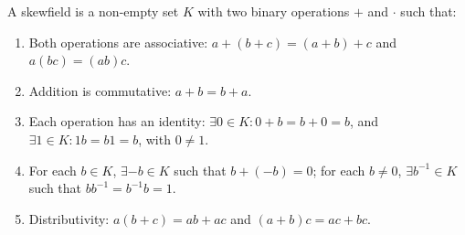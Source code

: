 A skewfield is a non-empty set $K$ with two binary operations $+$ and $\cdot$ such that:
\begin{enumerate}
\item Both operations are associative: $a+(b+c)=(a+b)+c$ and $a(bc)=(ab)c$.
\item Addition is commutative: $a+b=b+a$.
\item Each operation has an identity: $\exists 0 \in K: 0+b=b+0=b$, and $\exists 1 \in K: 1b=b1=b$, with $0 \neq 1$.
\item For each $b \in K$, $\exists -b \in K$ such that $b+(-b)=0$; for each $b \neq 0$, $\exists b^{-1} \in K$ such that $bb^{-1}=b^{-1}b=1$.
\item Distributivity: $a(b+c)=ab+ac$ and $(a+b)c=ac+bc$.
\end{enumerate}
